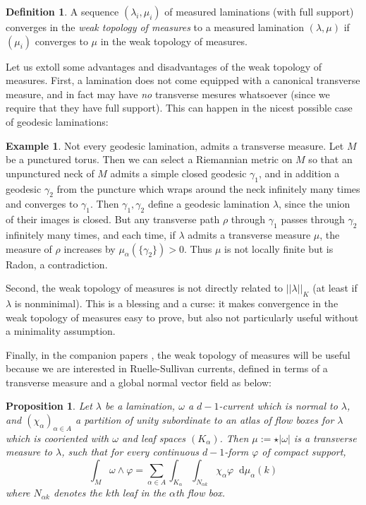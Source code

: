 \documentclass[reqno,10pt]{amsart}
\newcommand*\dif{\mathop{}\!\mathrm{d}}
\newcommand{\dfn}[1]{\emph{#1}\index{#1}}
\newtheorem{proposition}[theorem]{Proposition}
\theoremstyle{definition}
\newtheorem{definition}[theorem]{Definition}
\newtheorem{example}[theorem]{Example}
\numberwithin{equation}{section}
\begin{document}
\begin{definition}
A sequence $(\lambda_i, \mu_i)$ of measured laminations (with full support) converges in the \dfn{weak topology of measures} to a measured lamination $(\lambda, \mu)$ if $(\mu_i)$ converges to $\mu$ in the weak topology of measures.
\end{definition}

Let us extoll some advantages and disadvantages of the weak topology of measures.
First, a lamination does not come equipped with a canonical transverse measure, and in fact may have \emph{no} transverse mesures whatsoever (since we require that they have full support).
This can happen in the nicest possible case of geodesic laminations:

\begin{example}
Not every geodesic lamination, admits a transverse measure.
Let $M$ be a punctured torus.
Then we can select a Riemannian metric on $M$ so that an unpunctured neck of $M$ admits a simple closed geodesic $\gamma_1$, and in addition a geodesic $\gamma_2$ from the puncture which wraps around the neck infinitely many times and converges to $\gamma_1$.
Then $\gamma_1, \gamma_2$ define a geodesic lamination $\lambda$, since the union of their images is closed.
But any transverse path $\rho$ through $\gamma_1$ passes through $\gamma_2$ infinitely many times, and each time, if $\lambda$ admits a transverse measure $\mu$, the measure of $\rho$ increases by $\mu_\alpha(\{\gamma_2\}) > 0$.
Thus $\mu$ is not locally finite but is Radon, a contradiction.
\end{example}

Second, the weak topology of measures is not directly related to $||\lambda||_K$ (at least if $\lambda$ is nonminimal).
This is a blessing and a curse: it makes convergence in the weak topology of measures easy to prove, but also not particularly useful without a minimality assumption.

Finally, in the companion papers \cite{BackusFLG, DaskalopoulosPrep2}, the weak topology of measures will be useful because we are interested in Ruelle-Sullivan currents, defined in terms of a transverse measure and a global normal vector field as below:

\begin{proposition}\label{construction of ruelle sullivan currents}
Let $\lambda$ be a lamination, $\omega$ a $d-1$-current which is normal to $\lambda$, and $(\chi_\alpha)_{\alpha \in A}$ a partition of unity subordinate to an atlas of flow boxes for $\lambda$ which is cooriented with $\omega$ and leaf spaces $(K_\alpha)$.
Then $\mu := \star |\omega|$ is a transverse measure to $\lambda$, such that for every continuous $d-1$-form $\varphi$ of compact support,
$$\int_M \omega \wedge \varphi = \sum_{\alpha \in A} \int_{K_\alpha} \int_{N_{\alpha k}} \chi_\alpha \varphi \dif \mu_\alpha(k)$$
where $N_{\alpha k}$ denotes the $k$th leaf in the $\alpha$th flow box.
\end{proposition}
\end{document}
